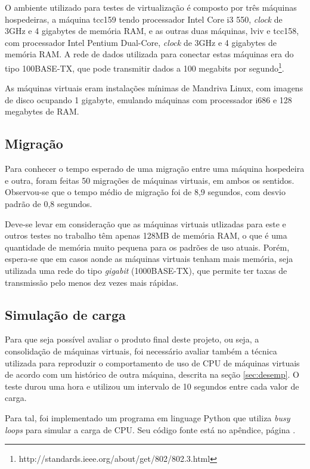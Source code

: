 O ambiente utilizado para testes de virtualização é composto por três máquinas
hospedeiras, a máquina tcc159 tendo processador Intel Core i3 550, \emph{clock}
de 3GHz e 4 gigabytes de memória RAM, e as outras duas máquinas, lviv e tcc158,
com processador Intel Pentium Dual-Core, \emph{clock} de 3GHz e 4 gigabytes de
memória RAM. A rede de dados utilizada para conectar estas máquinas era do tipo
100BASE-TX, que pode transmitir dados a 100 megabits por
segundo\footnote{http://standards.ieee.org/about/get/802/802.3.html}.


As máquinas virtuais eram instalações mínimas de Mandriva Linux, com imagens de
disco ocupando 1 gigabyte, emulando máquinas com processador i686 e 128
megabytes de RAM.

\subsection{Migração}

Para conhecer o tempo esperado de uma migração entre uma máquina hospedeira e
outra, foram feitas 50 migrações de máquinas virtuais, em ambos os sentidos.
Observou-se que o tempo médio de migração foi de 8,9 segundos, com desvio padrão
de 0,8 segundos.

Deve-se levar em consideração que as máquinas virtuais utlizadas para este e
outros testes no trabalho têm apenas 128MB de memória RAM, o que é uma
quantidade de memória muito pequena para os padrões de uso atuais. Porém,
espera-se que em casos aonde as máquinas virtuais tenham mais memória, seja
utilizada uma rede do tipo \emph{gigabit} (1000BASE-TX), que permite ter taxas
de transmissão pelo menos dez vezes mais rápidas.

\subsection{Simulação de carga}\label{sec:loadsim}

Para que seja possível avaliar o produto final deste projeto, ou seja, a
consolidação de máquinas virtuais, foi necessário avaliar também a técnica
utilizada para reproduzir o comportamento de uso de CPU de máquinas virtuais de
acordo com um histórico de outra máquina, descrita na seção \ref{sec:desemp}. O
teste durou uma hora e utilizou um intervalo de 10 segundos entre cada valor de
carga.

Para tal, foi implementado um programa em linguage Python que utiliza \emph{busy
loops} para simular a carga de CPU. Seu código fonte está no apêndice, página
\pageref{fig:progsimload}.


